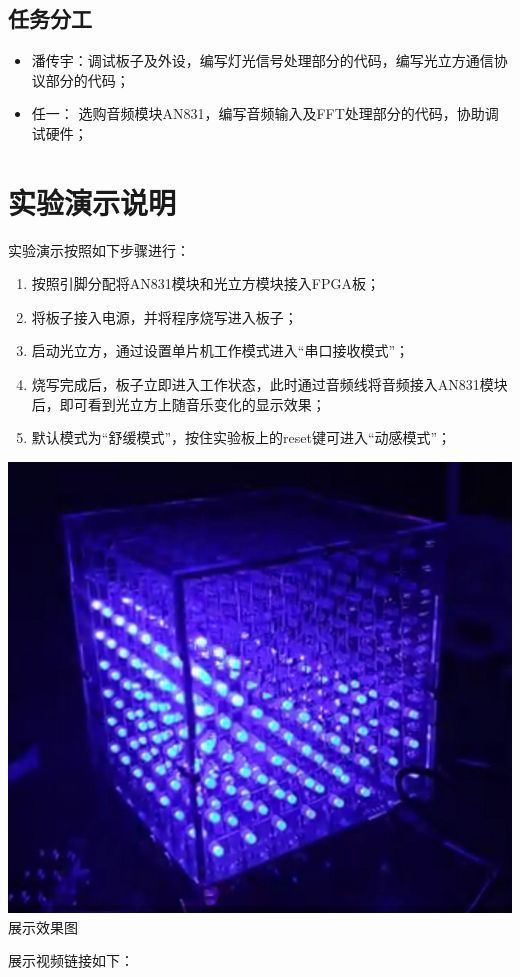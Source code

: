 \documentclass[12pt]{article}
\begin{document}
\subsection{任务分工}
\begin{itemize}
    \item 潘传宇：调试板子及外设，编写灯光信号处理部分的代码，编写光立方通信协议部分的代码；
    \item 任一： 选购音频模块AN831，编写音频输入及FFT处理部分的代码，协助调试硬件；
\end{itemize}

\section{实验演示说明}
实验演示按照如下步骤进行：
\begin{enumerate}
    \item 按照引脚分配将AN831模块和光立方模块接入FPGA板；
    \item 将板子接入电源，并将程序烧写进入板子；
    \item 启动光立方，通过设置单片机工作模式进入“串口接收模式”；
    \item 烧写完成后，板子立即进入工作状态，此时通过音频线将音频接入AN831模块后，即可看到光立方上随音乐变化的显示效果；
    \item 默认模式为“舒缓模式”，按住实验板上的reset键可进入“动感模式”；
\end{enumerate}
\begin{center}
    \includegraphics[scale=0.6]{pic/show1.png}
    \\\small{展示效果图}
\end{center}
展示视频链接如下：
\end{document}
